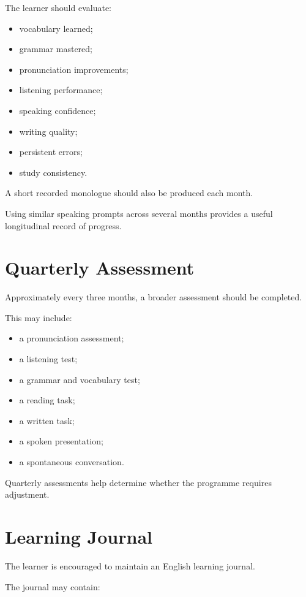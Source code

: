 The learner should evaluate:

\begin{itemize}
    \item vocabulary learned;
    \item grammar mastered;
    \item pronunciation improvements;
    \item listening performance;
    \item speaking confidence;
    \item writing quality;
    \item persistent errors;
    \item study consistency.
\end{itemize}

A short recorded monologue should also be produced each month.

Using similar speaking prompts across several months provides a useful longitudinal record of progress.

\section*{Quarterly Assessment}

Approximately every three months, a broader assessment should be completed.

This may include:

\begin{itemize}
    \item a pronunciation assessment;
    \item a listening test;
    \item a grammar and vocabulary test;
    \item a reading task;
    \item a written task;
    \item a spoken presentation;
    \item a spontaneous conversation.
\end{itemize}

Quarterly assessments help determine whether the programme requires adjustment.

\section*{Learning Journal}

The learner is encouraged to maintain an English learning journal.

The journal may contain:

